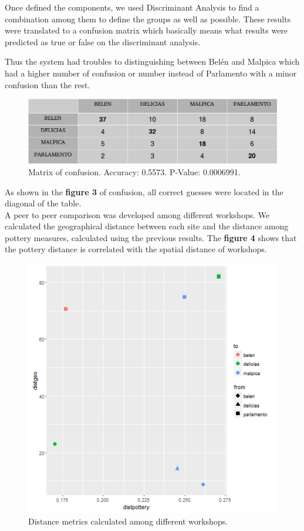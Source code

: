 \documentclass[a4paper]{article}
\begin{document}
Once defined the components, we used Discriminant Analysis to find a combination among them to define the groups as well as possible. These results were translated to a confusion matrix which basically means what results were predicted as true or false on the discriminant analysis. 

 Thus the system had troubles to distinguishing between Bel\'en and Malpica which had a higher number of confusion or number instead of Parlamento with a minor confusion than the rest. 

 
\begin{figure}
    \centering
\includegraphics[width=0.6\linewidth]{images/fig3.png}
\caption{Matrix of confusion. Accuracy: 0.5573. P-Value: 0.0006991.}
\end{figure}

As shown in the \textbf{figure 3} of confusion, all correct guesses were located in the diagonal of the table.\\
A peer to peer comparison was developed among different workshops. We calculated the geographical distance between each site and the distance among pottery measures, calculated using the previous results. The \textbf{figure 4}  shows that the pottery distance is correlated with the spatial distance of workshops.  

\begin{figure}
    \centering
\includegraphics[width=0.7\linewidth]{images/fig4.png}
\caption{Distance metrics calculated among different workshops.}
\end{figure}
\end{document}
